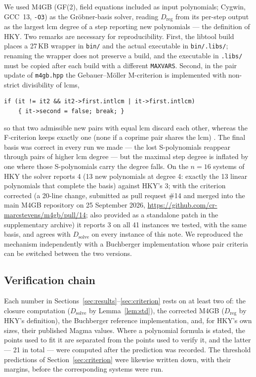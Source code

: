 \documentclass[11pt,a4paper]{article}
\theoremstyle{remark}\newtheorem{remark}{Remark}
\newcommand{\Dreg}{D_{\mathrm{reg}}}
\newcommand{\Dsolve}{D_{\mathrm{solve}}}
\begin{document}
We used M4GB \cite{MS17} (GF(2), field equations included as input polynomials; Cygwin, GCC~13, \texttt{-O3}) as the Gröbner-basis solver, reading $\Dreg$ from its per-step output as the largest lcm degree of a step reporting new polynomials --- the definition of HKY. Two remarks are necessary for reproducibility. First, the libtool build places a 27\,KB wrapper in \texttt{bin/} and the actual executable in \texttt{bin/.libs/}; renaming the wrapper does not preserve a build, and the executable in \texttt{.libs/} must be copied after each build with a different \texttt{MAXVARS}. Second, in the pair update of \texttt{m4gb.hpp} the Gebauer--Möller M-criterion is implemented with non-strict divisibility of lcms,
\begin{verbatim}
if (it != it2 && it2->first.intlcm | it->first.intlcm)
    { it->second = false; break; }
\end{verbatim}
so that two admissible new pairs with equal lcm discard each other, whereas the F-criterion keeps exactly one (none if a coprime pair shares the lcm) \cite{GM88}. The final basis was correct in every run we made --- the lost S-polynomials reappear through pairs of higher lcm degree --- but the maximal step degree is inflated by one where those S-polynomials carry the degree falls. On the $n=16$ systems of HKY the solver reports 4 (13 new polynomials at degree 4: exactly the 13 linear polynomials that complete the basis) against HKY's 3; with the criterion corrected (a 20-line change, submitted as pull request \#14 and merged into the main M4GB repository on 25 September 2026, \url{https://github.com/cr-marcstevens/m4gb/pull/14}; also provided as a standalone patch in the supplementary archive) it reports 3 on all 41 instances we tested, with the same basis, and agrees with $\Dsolve$ on every instance of this note. We reproduced the mechanism independently with a Buchberger implementation whose pair criteria can be switched between the two versions.

\subsection{Verification chain}

Each number in Sections~\ref{sec:results}--\ref{sec:criterion} rests on at least two of: the closure computation ($\Dsolve$ by Lemma~\ref{lem:std}), the corrected M4GB ($\Dreg$ by HKY's definition), the Buchberger reference implementation, and, for HKY's own sizes, their published Magma values. Where a polynomial formula is stated, the points used to fit it are separated from the points used to verify it, and the latter --- 21 in total --- were computed after the prediction was recorded. The threshold predictions of Section~\ref{sec:criterion} were likewise written down, with their margins, before the corresponding systems were run.
\end{document}
